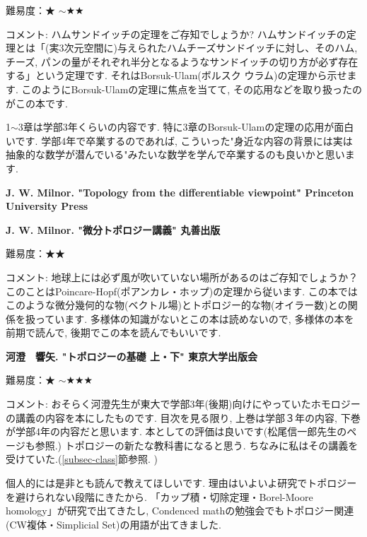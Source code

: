 難易度：★ $\sim$★★\vspace{-6pt} 

コメント: ハムサンドイッチの定理をご存知でしょうか? ハムサンドイッチの定理とは「(実3次元空間に)与えられたハムチーズサンドイッチに対し、そのハム, チーズ, パンの量がそれぞれ半分となるようなサンドイッチの切り方が必ず存在する」という定理です. それはBorsuk-Ulam(ボルスク ウラム)の定理から示せます. 
このようにBorsuk-Ulamの定理に焦点を当てて, その応用などを取り扱ったのがこの本です. 

1$\sim$3章は学部3年くらいの内容です. 特に3章のBorsuk-Ulamの定理の応用が面白いです. 学部4年で卒業するのであれば, こういった"身近な内容の背景には実は抽象的な数学が潜んでいる"みたいな数学を学んで卒業するのも良いかと思います. 
\vspace{8pt}

\textbf{J. W. Milnor. "Topology from the differentiable viewpoint" Princeton University Press}  　\vspace{-6pt} 

\textbf{J. W. Milnor. "微分トポロジー講義" 丸善出版}  　\vspace{-6pt} 

難易度：★★ \vspace{-6pt} 

コメント: 地球上には必ず風が吹いていない場所があるのはご存知でしょうか？ このことはPoincare-Hopf(ポアンカレ・ホップ)の定理から従います. この本ではこのような微分幾何的な物(ベクトル場)とトポロジー的な物(オイラー数)との関係を扱っています. 多様体の知識がないとこの本は読めないので, 多様体の本を前期で読んで, 後期でこの本を読んでもいいです. 
\vspace{8pt}


\textbf{河澄　響矢. "トポロジーの基礎 上・下" 東京大学出版会}  　\vspace{-6pt} 

難易度：★ $\sim$★★★\vspace{-6pt} 

コメント: おそらく河澄先生が東大で学部3年(後期)向けにやっていたホモロジーの講義の内容を本にしたものです. 目次を見る限り, 上巻は学部３年の内容, 下巻が学部4年の内容だと思います. 本としての評価は良いです(松尾信一郎先生のページも参照.) トポロジーの新たな教科書になると思う. ちなみに私はその講義を受けていた.(\ref{subsec-class}節参照. )

個人的には是非とも読んで教えてほしいです. 理由はいよいよ研究でトポロジーを避けられない段階にきたから. 「カップ積・切除定理・Borel-Moore homology」が研究で出てきたし, Condenced mathの勉強会でもトポロジー関連(CW複体・Simplicial Set)の用語が出てきました. 
\vspace{8pt}

